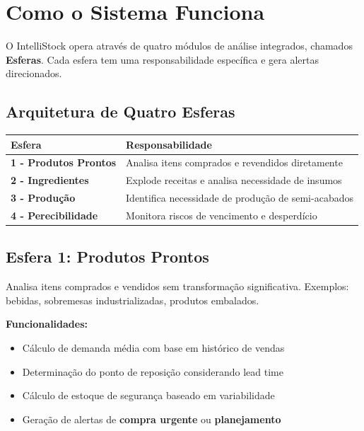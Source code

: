 
\section{Como o Sistema Funciona}

O IntelliStock opera através de quatro módulos de análise integrados,
chamados \textbf{Esferas}. Cada esfera tem uma responsabilidade
específica e gera alertas direcionados.

\subsection{Arquitetura de Quatro Esferas}

\begin{center}
\begin{tabular}{>{\bfseries}l p{8cm}}
\toprule
Esfera & Responsabilidade \\
\midrule
1 - Produtos Prontos   & Analisa itens comprados e revendidos diretamente \\
2 - Ingredientes       & Explode receitas e analisa necessidade de insumos \\
3 - Produção           & Identifica necessidade de produção de semi-acabados \\
4 - Perecibilidade     & Monitora riscos de vencimento e desperdício \\
\bottomrule
\end{tabular}
\end{center}

\subsection{Esfera 1: Produtos Prontos}

Analisa itens comprados e vendidos sem transformação significativa.
Exemplos: bebidas, sobremesas industrializadas, produtos embalados.

\textbf{Funcionalidades:}

\begin{itemize}[leftmargin=2em]
  \item Cálculo de demanda média com base em histórico de vendas
  \item Determinação do ponto de reposição considerando lead time
  \item Cálculo de estoque de segurança baseado em variabilidade
  \item Geração de alertas de \textbf{compra urgente} ou \textbf{planejamento}
\end{itemize}


